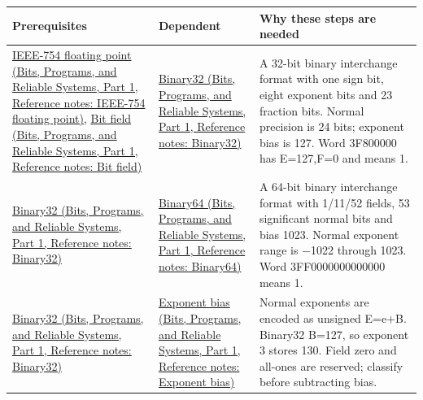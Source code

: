 {\def\LTcaptype{none} %
\begin{longtable}[]{@{}
  >{\raggedright\arraybackslash}p{}
  >{\raggedright\arraybackslash}p{}
  >{\raggedright\arraybackslash}p{}@{}}
\toprule\noalign{}
\begin{minipage}[b]{\linewidth}\raggedright
Prerequisites
\end{minipage} & \begin{minipage}[b]{\linewidth}\raggedright
Dependent
\end{minipage} & \begin{minipage}[b]{\linewidth}\raggedright
Why these steps are needed
\end{minipage} \\
\midrule\noalign{}
\endhead
\bottomrule\noalign{}
\endlastfoot
\href{../01-Bits-Programs-and-Reliable-Systems-P01/main.pdf\#appendix-343615f49ddf}{IEEE-754 floating point (Bits, Programs, and Reliable Systems, Part 1, Reference notes: IEEE-754 floating point)}, \href{../01-Bits-Programs-and-Reliable-Systems-P01/main.pdf\#appendix-ac697f5c66e8}{Bit field (Bits, Programs, and Reliable Systems, Part 1, Reference notes: Bit field)} & \href{../01-Bits-Programs-and-Reliable-Systems-P01/main.pdf\#appendix-5057f9ad327f}{Binary32 (Bits, Programs, and Reliable Systems, Part 1, Reference notes: Binary32)} & A 32-bit binary interchange format with one sign bit, eight exponent bits and 23 fraction bits. Normal precision is 24 bits; exponent bias is 127. Word 3F800000 has E=127,F=0 and means 1. \\
\href{../01-Bits-Programs-and-Reliable-Systems-P01/main.pdf\#appendix-5057f9ad327f}{Binary32 (Bits, Programs, and Reliable Systems, Part 1, Reference notes: Binary32)} & \href{../01-Bits-Programs-and-Reliable-Systems-P01/main.pdf\#appendix-5078dfab64e6}{Binary64 (Bits, Programs, and Reliable Systems, Part 1, Reference notes: Binary64)} & A 64-bit binary interchange format with 1/11/52 fields, 53 significant normal bits and bias 1023. Normal exponent range is −1022 through 1023. Word 3FF0000000000000 means 1. \\
\href{../01-Bits-Programs-and-Reliable-Systems-P01/main.pdf\#appendix-5057f9ad327f}{Binary32 (Bits, Programs, and Reliable Systems, Part 1, Reference notes: Binary32)} & \href{../01-Bits-Programs-and-Reliable-Systems-P01/main.pdf\#appendix-2fae058c82e1}{Exponent bias (Bits, Programs, and Reliable Systems, Part 1, Reference notes: Exponent bias)} & Normal exponents are encoded as unsigned E=e+B. Binary32 B=127, so exponent 3 stores 130. Field zero and all-ones are reserved; classify before subtracting bias. \\

\end{longtable}}
